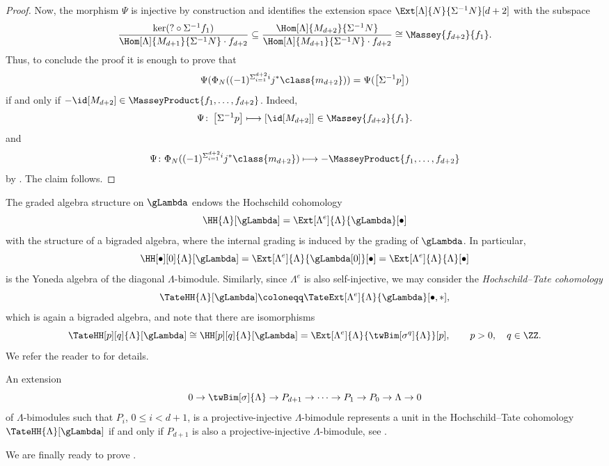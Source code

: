 \documentclass[a4paper]{amsart}
\begin{document}
\begin{proof}
  Now, the morphism $\Psi$ is injective by construction and identifies the
  extension space $\Ext[\Lambda]{N}{\Sigma^{-1}N}[d+2]$ with the subspace
  \[
    \frac{\ker(?\circ\Sigma^{-1}f_1)}{\Hom[\Lambda]{M_{d+1}}{\Sigma^{-1}N}\cdot
      f_{d+2}}\subseteq\frac{\Hom[\Lambda]{M_{d+2}}{\Sigma^{-1}N}}{\Hom[\Lambda]{M_{d+1}}{\Sigma^{-1}N}\cdot
      f_{d+2}}\cong\Massey{f_{d+2}}{f_1}.
  \]
  Thus, to conclude the proof it is enough to prove that
  \[
    \Psi(\Phi_N((-1)^{\Sigma_{i=1}^{d+2}i}j^*\class{m_{d+2}}))=\Psi(\left[\Sigma^{-1}p
    \right])
  \]
  if and only if $-\id[M_{d+2}]\in\MasseyProduct{f_1,\dots,f_{d+2}}$. Indeed,
  \[
    \Psi\colon
    \left[\Sigma^{-1}p\right]\longmapsto\left[\id[M_{d+2}]\right]\in\Massey{f_{d+2}}{f_1}.
  \]
  and
  \[
    \Psi\colon
    \Phi_N((-1)^{\Sigma_{i=1}^{d+2}i}j^*\class{m_{d+2}})\longmapsto-\MasseyProduct{f_1,\dots,f_{d+2}}
  \]
  by . The claim follows.
\end{proof}

The graded algebra structure on $\gLambda$ endows the Hochschild cohomology
\[
  \HH{\Lambda}[\gLambda]=\Ext[\Lambda^e]{\Lambda}{\gLambda}[\bullet]
\]
with the structure of a bigraded algebra, where the internal grading is induced
by the grading of $\gLambda$. In particular,
\[
  \HH[\bullet][0]{\Lambda}[\gLambda]=\Ext[\Lambda^e]{\Lambda}{\gLambda[0]}[\bullet]=\Ext[\Lambda^e]{\Lambda}{\Lambda}[\bullet]
\]
is the Yoneda algebra of the diagonal $\Lambda$-bimodule. Similarly, since
$\Lambda^e$ is also self-injective, we may consider the \emph{Hochschild--Tate
  cohomology}
\[
  \TateHH{\Lambda}[\gLambda]\coloneqq\TateExt[\Lambda^e]{\Lambda}{\gLambda}[\bullet,*],
\]
which is again a bigraded algebra, and note that there are isomorphisms
\[
  \TateHH[p][q]{\Lambda}[\gLambda]\cong\HH[p][q]{\Lambda}[\gLambda]=\Ext[\Lambda^e]{\Lambda}{\twBim[\sigma^q]{\Lambda}}[p],\qquad
  p>0,\quad q\in\ZZ.
\]
We refer the reader to \cite[Sec.~5]{Mur22} for details.

\begin{remark}
  \label{rmk:TateUnits}
  An extension
  \[
    0\to\twBim[\sigma]{\Lambda}\to P_{d+1}\to\cdots\to P_1\to P_0\to\Lambda\to0
  \]
  of $\Lambda$-bimodules such that $P_i$, $0\leq i<d+1$, is a
  projective-injective $\Lambda$-bimodule represents a unit in the
  Hochschild--Tate cohomology $\TateHH{\Lambda}[\gLambda]$ if and only if
  $P_{d+1}$ is also a projective-injective $\Lambda$-bimodule, see
  \cite[Rmk.~5.9]{Mur22}.
\end{remark}

We are finally ready to prove .
\end{document}
